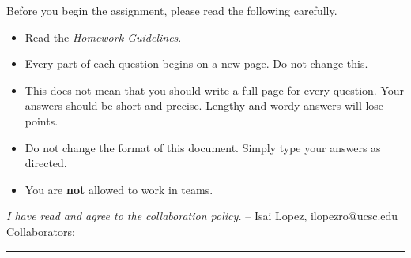 \documentclass[11pt]{article}
\begin{document}
\renewcommand{\P}{\mbox{IH}}
Before you begin the assignment, please read the following carefully.
\begin{itemize}
    \item Read the \emph{Homework Guidelines}.
    \item Every part of each question begins on a new page. Do not change this.
    \item This does not mean that you should write a full page for every question. Your answers should be short and precise. Lengthy and wordy answers will lose points.
    \item Do not change the format of this document. Simply type your answers as directed.
    \item You are \textbf{not} allowed to work in teams.
\end{itemize}
\emph{I have read and agree to the collaboration policy.}  -- Isai Lopez, ilopezro@ucsc.edu
\\
Collaborators: %
\\
\hrule
\end{document}

